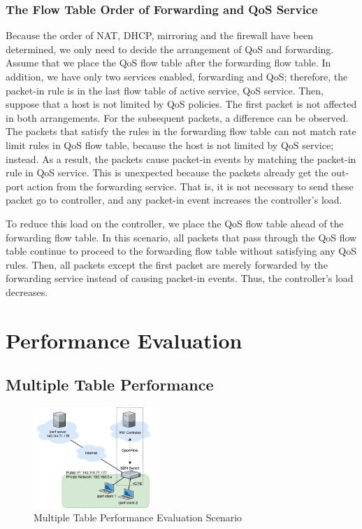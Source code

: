 \documentclass[conference]{IEEEtran}
\begin{document}
\subsubsection{The Flow Table Order of Forwarding and QoS Service}
Because the order of NAT, DHCP, mirroring and the firewall have been determined, we only need to decide the arrangement of QoS and forwarding. Assume that we place the QoS flow table after the forwarding flow table. In addition, we have only two services enabled, forwarding and QoS; therefore, the packet-in rule is in the last flow table of active service, QoS service. Then, suppose that a host is not limited by QoS policies. The first packet is not affected in both arrangements. For the subsequent packets, a difference can be observed. The packets that satisfy the rules in the forwarding flow table can not match rate limit rules in QoS flow table, because the host is not limited by QoS service; instead. As a result, the packets cause packet-in events by matching the packet-in rule in QoS service. This is unexpected because the packets already get the out-port action from the forwarding service. That is, it is not necessary to send these packet go to controller, and any packet-in event increases the controller’s load.

To reduce this load on the controller, we place the QoS flow table ahead of the forwarding flow table. In this scenario, all packets that pass through the QoS flow table continue to proceed to the forwarding flow table without satisfying any QoS rules. Then, all packets except the first packet are merely forwarded by the forwarding service instead of causing packet-in events. Thus, the controller’s load decreases.




\section{Performance Evaluation}
\subsection{Multiple Table Performance}

\begin{figure}[!t]
\centering
\includegraphics[width=0.4\textwidth]{./figures/evaluation_nat_scenario}
\caption{Multiple Table Performance Evaluation Scenario}
\label{fig:evaluation_nat_scenario}
\end{figure}
\end{document}

